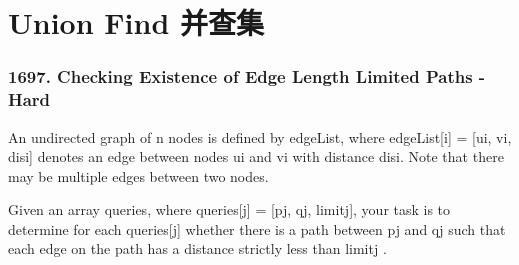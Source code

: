 \documentclass[9pt, b5paaper]{book}
\begin{document}
\chapter{Union Find 并查集}
\label{sec-10}
\subsection{1697. Checking Existence of Edge Length Limited Paths - Hard}
\label{sec-10-0-1}
An undirected graph of n nodes is defined by edgeList, where edgeList[i] = [ui, vi, disi] denotes an edge between nodes ui and vi with distance disi. Note that there may be multiple edges between two nodes.

Given an array queries, where queries[j] = [pj, qj, limitj], your task is to determine for each queries[j] whether there is a path between pj and qj such that each edge on the path has a distance strictly less than limitj .
\end{document}
